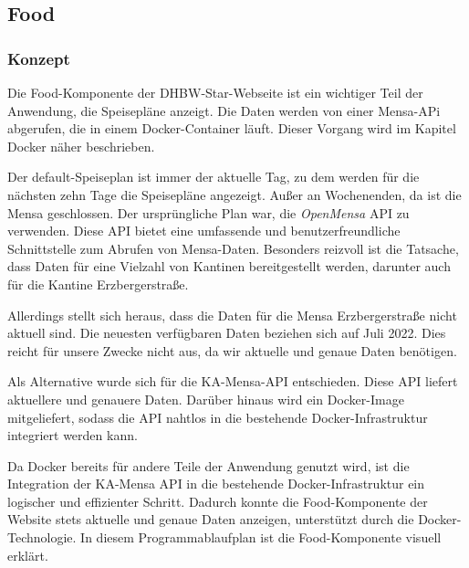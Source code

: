 \subsection{Food}
\subsubsection{Konzept}
Die Food-Komponente der DHBW-Star-Webseite ist ein wichtiger Teil der Anwendung, die Speisepläne anzeigt.
Die Daten werden von einer Mensa-APi abgerufen, die in einem Docker-Container läuft. Dieser Vorgang wird im Kapitel Docker näher beschrieben.

Der default-Speiseplan ist immer der aktuelle Tag, zu dem werden für die nächsten zehn Tage die Speisepläne angezeigt. Außer an Wochenenden, da ist die Mensa geschlossen.
Der ursprüngliche Plan war, die \emph{OpenMensa} API zu verwenden. Diese API bietet eine umfassende und benutzerfreundliche Schnittstelle zum Abrufen von Mensa-Daten. Besonders reizvoll ist die Tatsache, dass Daten für eine Vielzahl von Kantinen bereitgestellt werden, darunter auch für die Kantine Erzbergerstraße. \cite{openmensa}

Allerdings stellt sich heraus, dass die Daten für die Mensa Erzbergerstraße nicht aktuell sind. Die neuesten verfügbaren Daten beziehen sich auf Juli 2022. Dies reicht für unsere Zwecke nicht aus, da wir aktuelle und genaue Daten benötigen. \cite{openmensa-canteen33}

Als Alternative wurde sich für die KA-Mensa-API entschieden. Diese API liefert aktuellere und genauere Daten. Darüber hinaus wird ein Docker-Image mitgeliefert, sodass die API nahtlos in die bestehende Docker-Infrastruktur integriert werden kann. \cite{ka-mensa-api}

Da Docker bereits für andere Teile der Anwendung genutzt wird, ist die Integration der KA-Mensa API in die bestehende Docker-Infrastruktur ein logischer und effizienter Schritt. Dadurch konnte die Food-Komponente der Website stets aktuelle und genaue Daten anzeigen, unterstützt durch die Docker-Technologie.
In diesem Programmablaufplan ist die Food-Komponente visuell erklärt.

